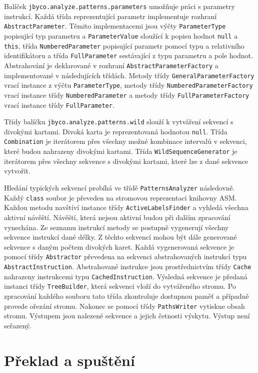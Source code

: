Balíček \texttt{jbyco.analyze.patterns.parameters} umožňuje práci s parametry instrukcí. Každá třída reprezentující parametr implementuje rozhraní \texttt{AbstractParameter}. Těmito implementacemi jsou výčty \texttt{ParameterType} popisující typ parametru a \texttt{ParameterValue} sloužící k popisu hodnot \texttt{null} a \texttt{this}, třída \texttt{NumberedParameter} popisující parametr pomocí typu a relativního identifikátoru a třída \texttt{FullParameter} sestávající z typu parametru a pole hodnot. Abstrahování je deklarované v rozhraní \texttt{AbstractParameterFactory} a implementované v následujících třídách. Metody třídy \texttt{GeneralParameterFactory} vrací instance z výčtu \texttt{ParameterType}, metody třídy \texttt{NumberedParameterFactory} vrací instance třídy \texttt{NumberedParameter} a metody třídy \texttt{FullParameterFactory} vrací instance třídy \texttt{FullParameter}.

Třídy balíčku \texttt{jbyco.analyze.patterns.wild} slouží k vytváření sekvencí s divokými kartami. Divoká karta je reprezentovaná hodnotou \texttt{null}. Třída \texttt{Combination} je iterátorem přes všechny možné kombinace intervalů v sekvenci, které budou nahrazeny divokými kartami. Třída \texttt{WildSequenceGenerator} je iterátorem přes všechny sekvence s divokými kartami, které lze z dané sekvence vytvořit.

Hledání typických sekvencí probíhá ve třídě \texttt{PatternsAnalyzer} následovně. Každý \texttt{class} soubor je převeden na stromovou reprezentaci knihovny ASM. Každou metodu navštíví instance třídy \texttt{ActiveLabelsFinder} a vyhledá všechna aktivní návěští. Návěští, která nejsou aktivní budou při dalším zpracování vynechána. Ze seznamu instrukcí metody se postupně vygenerují všechny sekvence instrukcí dané délky. Z těchto sekvencí mohou být dále generované sekvence s daným počtem divokých karet. Každá vygenerovaná sekvence je pomocí třídy \texttt{Abstractor} převedena na sekvenci abstrahovaných instrukcí typu \texttt{AbstractInstruction}. Abstrahované instrukce jsou prostřednictvím třídy \texttt{Cache} nahrazeny instrukcemi typu \texttt{CachedInstruction}. Výsledná sekvence je předaná instanci třídy \texttt{TreeBuilder}, která sekvenci vloží do vytvářeného stromu. Po zpracování každého souboru tato třída zkontroluje dostupnou paměť a případně provede ořezání stromu. Nakonec se pomocí třídy \texttt{PathsWriter} vytiskne obsah stromu. Výstupem jsou nalezené sekvence a jejich četnosti výskytu. Výstup není seřazený.

\section{Překlad a spuštění}\label{ToolRun}



